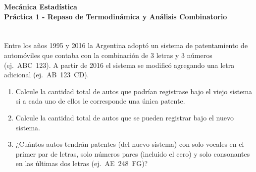 \documentclass[a4paper,11pt]{article}
\begin{document}
\pagestyle{fancy}
\chead{\small \the\year}



\thispagestyle{plain}
\begin{center}
    \textbf{\large
        Mecánica Estadística \\
        Práctica 1 - Repaso de Termodinámica y Análisis Combinatorio
    }
\end{center}
\vspace{-1.5em}




\section{}

Entre los años 1995 y 2016 la Argentina adoptó un sistema de patentamiento de
automóviles que contaba con la combinación de 3 letras y 3 números (ej.~ABC~123).
A partir de 2016 el sistema se modificó agregando una letra adicional (ej.~AB~123~CD).

\begin{enumerate}[label=(\alph*),
                  leftmargin=2\parindent,
                  rightmargin=2\parindent]

    \item{
        Calcule la cantidad total de autos que podrían registrase bajo el viejo sistema
        si a cada uno de ellos le corresponde una única patente.
    }

    \item{
        Calcule la cantidad total de autos que se pueden registrar bajo el nuevo
        sistema.
    }

    \item{
        ¿Cuántos autos tendrán patentes (del nuevo sistema) con solo vocales en el
        primer par de letras, solo números pares (incluido el cero) y solo consonantes
        en las últimas dos letras (ej.~AE~248~FG)?
    }

\end{enumerate}


\section{}
\end{document}
